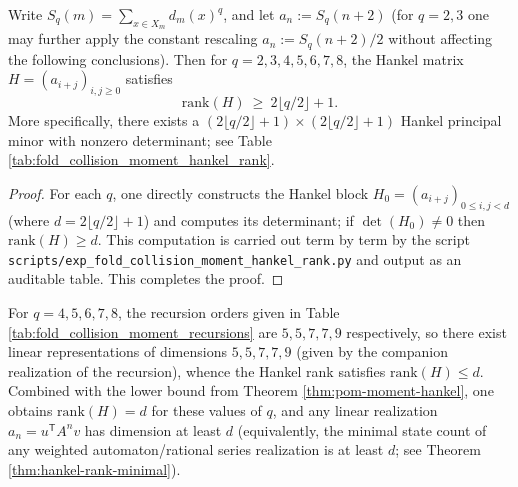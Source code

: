 \begin{theorem}\label{thm:pom-moment-hankel}
Write \(S_q(m)=\sum_{x\in X_m} d_m(x)^q\), and let \(a_n:=S_q(n+2)\) (for \(q=2,3\) one may further apply the constant rescaling \(a_n:=S_q(n+2)/2\) without affecting the following conclusions). Then for \(q=2,3,4,5,6,7,8\), the Hankel matrix \(H=(a_{i+j})_{i,j\ge 0}\) satisfies
\[
\mathrm{rank}(H)\ \ge\ 2\lfloor q/2\rfloor+1.
\]
More specifically, there exists a \((2\lfloor q/2\rfloor+1)\times(2\lfloor q/2\rfloor+1)\) Hankel principal minor with nonzero determinant; see Table \ref{tab:fold_collision_moment_hankel_rank}.
\end{theorem}
\begin{proof}
For each \(q\), one directly constructs the Hankel block \(H_0=(a_{i+j})_{0\le i,j<d}\) (where \(d=2\lfloor q/2\rfloor+1\)) and computes its determinant; if \(\det(H_0)\neq 0\) then \(\mathrm{rank}(H)\ge d\). This computation is carried out term by term by the script \texttt{scripts/exp\_fold\_collision\_moment\_hankel\_rank.py} and output as an auditable table. This completes the proof.
\end{proof}

\begin{corollary}\label{cor:pom-moment-minreal}
For \(q=4,5,6,7,8\), the recursion orders given in Table \ref{tab:fold_collision_moment_recursions} are \(5,5,7,7,9\) respectively, so there exist linear representations of dimensions \(5,5,7,7,9\) (given by the companion realization of the recursion), whence the Hankel rank satisfies \(\mathrm{rank}(H)\le d\). Combined with the lower bound from Theorem \ref{thm:pom-moment-hankel}, one obtains \(\mathrm{rank}(H)=d\) for these values of \(q\), and any linear realization \(a_n=u^{\mathsf T}A^n v\) has dimension at least \(d\) (equivalently, the minimal state count of any weighted automaton/rational series realization is at least \(d\); see Theorem \ref{thm:hankel-rank-minimal}).
\end{corollary}




